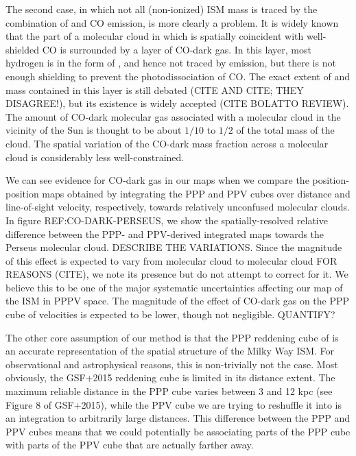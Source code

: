 The second case, in which not all (non-ionized) ISM mass is traced by the combination of \atomH and CO emission, is more clearly a problem. It is widely known that the part of a molecular cloud in which \molH is spatially coincident with well-shielded CO is surrounded by a layer of CO-dark gas. In this layer, most hydrogen is in the form of \molH, and hence not traced by \atomH emission, but there is not enough shielding to prevent the photodissociation of CO. The exact extent of and mass contained in this layer is still debated (CITE AND CITE; THEY DISAGREE!), but its existence is widely accepted (CITE BOLATTO REVIEW). The amount of CO-dark molecular gas associated with a molecular cloud in the vicinity of the Sun is thought to be about $1/10$ to $1/2$ of the total mass of the cloud. The spatial variation of the CO-dark mass fraction across a molecular cloud is considerably less well-constrained.

 We can see evidence for CO-dark gas in our maps when we compare the position-position maps obtained by integrating the PPP and PPV cubes over distance and line-of-sight velocity, respectively, towards relatively unconfused molecular clouds. In figure REF:CO-DARK-PERSEUS, we show the spatially-resolved relative difference between the PPP- and PPV-derived integrated maps towards the Perseus molecular cloud. DESCRIBE THE VARIATIONS. Since the magnitude of this effect is expected to vary from molecular cloud to molecular cloud FOR REASONS (CITE), we note its presence but do not attempt to correct for it. We believe this to be one of the major systematic uncertainties affecting our map of the ISM in PPPV space. The magnitude of the effect of CO-dark gas on the PPP cube of velocities is expected to be lower, though not negligible. QUANTIFY?

The other core assumption of our method is that the PPP reddening cube of \citet{Green_2015}  is an accurate representation of the spatial structure of the Milky Way ISM. For observational and astrophysical reasons, this is non-trivially not the case. Most obviously, the GSF+2015 reddening cube is limited in its distance extent. The maximum reliable distance in the PPP cube varies between 3 and 12 kpc (see Figure 8 of GSF+2015), while the PPV cube we are trying to reshuffle it into is an integration to arbitrarily large distances. This difference between the PPP and PPV cubes means that we could potentially be associating parts of the PPP cube with parts of the PPV cube that are actually farther away.

